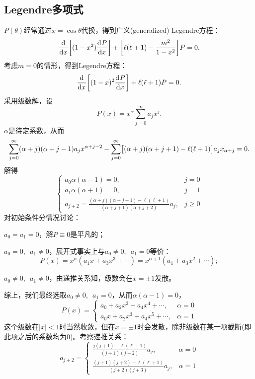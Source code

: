 \subsection{Legendre多项式}
\label{ssec:Legendre polynomial}

$P(\theta)$经常通过$x=\cos\theta$代换，得到广义(generalized) Legendre方程：
\begin{equation}
    \label{eqn:general Legendre}
    \frac{\mathrm{d}^{{}}}{\mathrm{d}{x}^{{}}}\biggl[(1-x^2)\frac{\mathrm{d}^{{}}P}{\mathrm{d}{x}^{{}}}\biggr]+\biggl[\ell(\ell+1)-\frac{m^2}{1-x^2}\biggr]P=0.
\end{equation}
考虑$m=0$的情形，得到Legendre方程：
\begin{equation}
    \label{eqn:Legendre}
    \frac{\mathrm{d}^{{}}}{\mathrm{d}{x}^{{}}}\biggl[(1-x)^2\frac{\mathrm{d}^{{}}P}{\mathrm{d}{x}^{{}}}\biggr]+\ell(\ell+1)P=0.
\end{equation}
采用级数解，设
\[
    P(x)=x^\alpha\sum_{j=0}^\infty a_jx^j.
\]
$\alpha$是待定系数，从而 
\[
    \sum_{j=0}^\infty(\alpha+j)(\alpha+j-1)a_j x^{\alpha+j-2}-\sum_{j=0}^\infty\bigl[(\alpha+j)(\alpha+j+1)-\ell(\ell+1)\bigr]a_jx_{\alpha+j}=0.
\]
解得
\[
    \begin{cases}
        a_0\alpha(\alpha-1)=0,&j=0\\
        a_1\alpha(\alpha+1)=0,&j=1\\
        a_{j+2}=\frac{(\alpha+j)(\alpha+j+1)-\ell(\ell+1)}{(\alpha+j+1)(\alpha+j+2)}a_j,&j\geqslant 0
    \end{cases}
\]
对初始条件分情况讨论：
\begin{compactitem}
	\item $a_0=a_1=0$，解$P\equiv 0$是平凡的；
	\item $a_0=0,\enspace a_1\neq 0$，展开式事实上与$a_0\neq 0,\enspace a_1=0$等价：
	\[
        P(x)=x^\alpha(a_1x+a_3x^3+\cdots)=x^{\alpha+1}(a_1+a_3x^2+\cdots);
    \]
	\item $a_0\neq 0,\enspace a_1\neq 0$，由递推关系知，级数会在$x=\pm 1$发散。
\end{compactitem}
综上，我们最终选取$a_0\neq 0,\enspace a_1=0$，从而$\alpha(\alpha-1)=0$，
\[
    P(x)=\begin{cases}
        a_0+a_2x^2+a_4x^4+\cdots,&\alpha=0\\
        a_0x+a_2x^3+a_4x^5+\cdots,&\alpha=1
    \end{cases}
\]
这个级数在$|x|<1$时当然收敛，但在$x=\pm 1$时会发散，除非级数在某一项截断(即此项之后的系数均为0)。考察递推关系：
\[
    a_{j+2}=\begin{cases}
        \frac{j(j+1)-\ell(\ell+1)}{(j+1)(j+2)}a_j,&\alpha=0\\[2ex]
        \frac{(j+1)(j+2)-\ell(\ell+1)}{(j+2)(j+3)}a_j,&\alpha=1
    \end{cases}
\]
